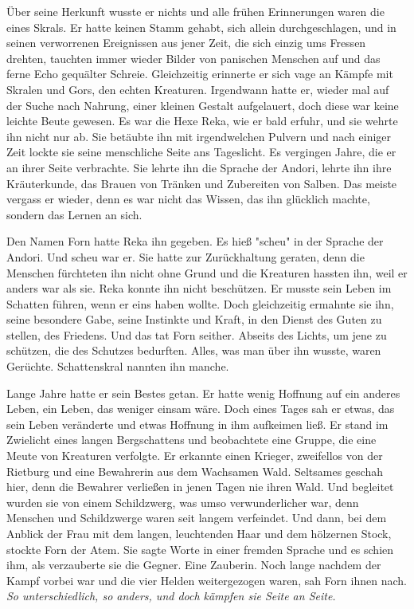 \documentclass[10pt, a4paper, oneside]{book}
\begin{document}
\begin{multicols}{2}
Über seine Herkunft wusste er nichts und alle frühen Erinnerungen waren die eines Skrals. Er hatte keinen Stamm gehabt, sich allein durchgeschlagen, und in seinen verworrenen Ereignissen aus jener Zeit, die sich einzig ums Fressen drehten, tauchten immer wieder Bilder von panischen Menschen auf und das ferne Echo gequälter Schreie. Gleichzeitig erinnerte er sich vage an Kämpfe mit Skralen und Gors, den echten Kreaturen. Irgendwann hatte er, wieder mal auf der Suche nach Nahrung, einer kleinen Gestalt aufgelauert, doch diese war keine leichte Beute gewesen. Es war die Hexe Reka, wie er bald erfuhr, und sie wehrte ihn nicht nur ab. Sie betäubte ihn mit irgendwelchen Pulvern und nach einiger Zeit lockte sie seine menschliche Seite ans Tageslicht. Es vergingen Jahre, die er an ihrer Seite verbrachte. Sie lehrte ihn die Sprache der Andori, lehrte ihn ihre Kräuterkunde, das Brauen von Tränken und Zubereiten von Salben. Das meiste vergass er wieder, denn es war nicht das Wissen, das ihn glücklich machte, sondern das Lernen an sich. 

Den Namen Forn hatte Reka ihn gegeben. Es hieß "scheu" in der Sprache der Andori. Und scheu war er. Sie hatte zur Zurückhaltung geraten, denn die Menschen fürchteten ihn nicht ohne Grund und die Kreaturen hassten ihn, weil er anders war als sie. Reka konnte ihn nicht beschützen. Er musste sein Leben im Schatten führen, wenn er eins haben wollte. Doch gleichzeitig ermahnte sie ihn, seine besondere Gabe, seine Instinkte und Kraft, in den Dienst des Guten zu stellen, des Friedens. Und das tat Forn seither. Abseits des Lichts, um jene zu schützen, die des Schutzes bedurften. Alles, was man über ihn wusste, waren Gerüchte. Schattenskral nannten ihn manche. 

Lange Jahre hatte er sein Bestes getan. Er hatte wenig Hoffnung auf ein anderes Leben, ein Leben, das weniger einsam wäre. Doch eines Tages sah er etwas, das sein Leben veränderte und etwas Hoffnung in ihm aufkeimen ließ. Er stand im Zwielicht eines langen Bergschattens und beobachtete eine Gruppe, die eine Meute von Kreaturen verfolgte. Er erkannte einen Krieger, zweifellos von der Rietburg und eine Bewahrerin aus dem Wachsamen Wald. Seltsames geschah hier, denn die Bewahrer verließen in jenen Tagen nie ihren Wald. Und begleitet wurden sie von einem Schildzwerg, was umso verwunderlicher war, denn Menschen und Schildzwerge waren seit langem verfeindet. Und dann, bei dem Anblick der Frau mit dem langen, leuchtenden Haar und dem hölzernen Stock, stockte Forn der Atem. Sie sagte Worte in einer fremden Sprache und es schien ihm, als verzauberte sie die Gegner. Eine Zauberin. Noch lange nachdem der Kampf vorbei war und die vier Helden weitergezogen waren, sah Forn ihnen nach. \textit{So unterschiedlich, so anders, und doch kämpfen sie Seite an Seite.}


\end{multicols}
\end{document}
